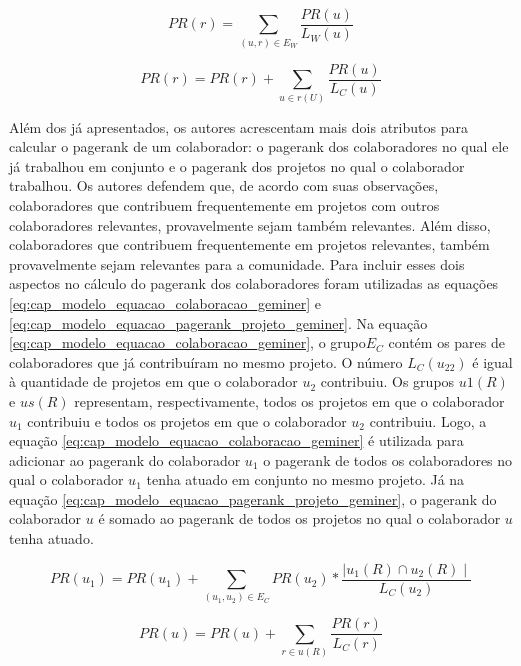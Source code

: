 \begin{equation}
\label{eq:cap_modelo_equacao_watch_geminer}
PR(r) =    \sum_{(u,r) \in E_W}  \frac{PR(u)}{L_W(u)}
\end{equation}

\begin{equation}
\label{eq:cap_modelo_equacao_contribuicao_projeto_geminer}
PR(r) = PR(r) +    \sum_{u  \in r(U) }  \frac{PR(u)}{L_C(u)}
\end{equation}

 Além dos já apresentados, os autores acrescentam mais dois atributos para calcular o pagerank de um colaborador: o pagerank dos colaboradores no qual ele já trabalhou em conjunto e o pagerank dos projetos no qual o colaborador trabalhou. Os autores defendem que, de acordo com suas observações, colaboradores que contribuem frequentemente em projetos com outros colaboradores relevantes, provavelmente sejam também relevantes. Além disso, colaboradores que contribuem frequentemente em projetos relevantes, também provavelmente sejam relevantes para a comunidade.  Para incluir esses dois aspectos no cálculo do pagerank dos colaboradores foram utilizadas as equações \ref{eq:cap_modelo_equacao_colaboracao_geminer} e \ref{eq:cap_modelo_equacao_pagerank_projeto_geminer}. Na equação  \ref{eq:cap_modelo_equacao_colaboracao_geminer}, o grupo$ E_C$ contém os pares de colaboradores que já  contribuíram no mesmo projeto. O número $L_C(u_22)$  é igual à quantidade de projetos em que o colaborador $u_2$ contribuiu. Os grupos $u1(R)$ e $us(R)$ representam, respectivamente, todos os projetos em que o colaborador $u_1$ contribuiu e  todos os projetos em que o colaborador $u_2$ contribuiu. Logo, a equação \ref{eq:cap_modelo_equacao_colaboracao_geminer}  é utilizada para adicionar ao pagerank do colaborador $u_1$ o pagerank de todos os colaboradores no qual o colaborador $u_1$ tenha atuado em conjunto no mesmo projeto. Já na equação \ref{eq:cap_modelo_equacao_pagerank_projeto_geminer}, o pagerank do colaborador $u$ é somado ao pagerank de todos os projetos no qual o colaborador $u$ tenha atuado.
 


\begin{equation}
\label{eq:cap_modelo_equacao_colaboracao_geminer}
PR(u_1) =  PR(u_1) +   \sum_{(u_1,u_2) \in E_C}  PR(u_2) * \frac{\mid u_1(R) \cap u_2(R)\mid}{L_C(u_2)}
\end{equation}

\begin{equation}
\label{eq:cap_modelo_equacao_pagerank_projeto_geminer}
PR(u) = PR(u) +    \sum_{r  \in u(R) }  \frac{PR(r)}{L_C(r)}
\end{equation}



